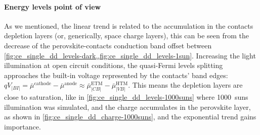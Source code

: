 		\paragraph{Energy levels point of view}\label{ce_energy_levels}
		As we mentioned, the linear trend is related to the accumulation in the contacts depletion layers (or, generically, space charge layers), this can be seen from the decrease of the perovskite\hyp{}contacts conduction band offset between \cref{fig:ce_single_dd_levels-dark,,fig:ce_single_dd_levels-1sun}.
		Increasing the light illumination at open circuit conditions, the quasi\hyp{}Fermi levels splitting approaches the built\hyp{}in voltage represented by the contacts' band edges: $qV_|BI| = \bar\mu^{\mathrm{cathode}} - \bar\mu^{\mathrm{anode}} \approx \bar\mu_|CB|^{\mathrm{ETM}} - \bar\mu_|VB|^{\mathrm{HTM}}$.
		This means the depletion layers are close to saturation, like in \cref{fig:ce_single_dd_levels-1000suns} where \SI{1000}{suns} illumination was simulated, and the charge accumulates in the perovskite layer, as shown in \cref{fig:ce_single_dd_charge-1000suns}, and the exponential trend gains importance.

		\begin{figure}
		\end{figure}

